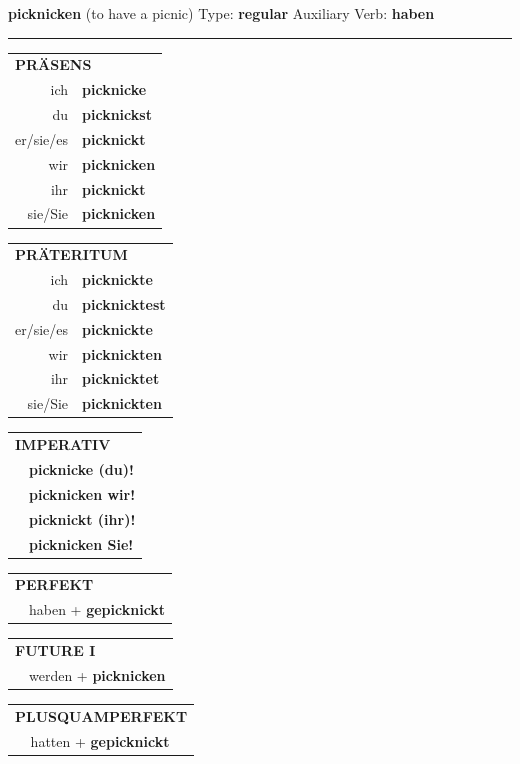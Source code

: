 \documentclass[10pt,a4paper]{revtex4-2}
\begin{document}
\begin{verbbox}
{\Large \bf picknicken} (to have a picnic) \hfill Type: \textbf{regular} \hfill Auxiliary Verb: \textbf{haben}

\vspace{5pt}
\hrule
\vspace{5pt}

\begin{tabular}{rl}
\multicolumn{2}{l}{\textbf{PRÄSENS}}\\
ich & \textbf{picknicke}\\
du & \textbf{picknickst}\\
er/sie/es & \textbf{picknickt}\\
wir & \textbf{picknicken}\\
ihr & \textbf{picknickt}\\
sie/Sie & \textbf{picknicken}\\
\end{tabular}
\hfill
\begin{tabular}{rl}
\multicolumn{2}{l}{\textbf{PRÄTERITUM}}\\
ich & \textbf{picknickte}\\
du & \textbf{picknicktest}\\
er/sie/es & \textbf{picknickte}\\
wir & \textbf{picknickten}\\
ihr & \textbf{picknicktet}\\
sie/Sie & \textbf{picknickten}\\
\end{tabular}
\hfill
\begin{tabular}{rl}
\multicolumn{2}{l}{\textbf{IMPERATIV}}\\
& \textbf{picknicke (du)!}\\
& \textbf{picknicken wir!}\\
& \textbf{picknickt (ihr)!}\\
& \textbf{picknicken Sie!}\\
\end{tabular}

\vspace{10pt}

\begin{tabular}{rl}
\multicolumn{2}{l}{\textbf{PERFEKT}}\\
& haben + \textbf{gepicknickt}\\
\end{tabular}
\hfill
\begin{tabular}{rl}
\multicolumn{2}{l}{\textbf{FUTURE I}}\\
& werden + \textbf{picknicken}\\
\end{tabular}
\hfill
\begin{tabular}{rl}
\multicolumn{2}{l}{\textbf{PLUSQUAMPERFEKT}}\\
& hatten + \textbf{gepicknickt}\\
\end{tabular}


\end{verbbox}
\end{document}
